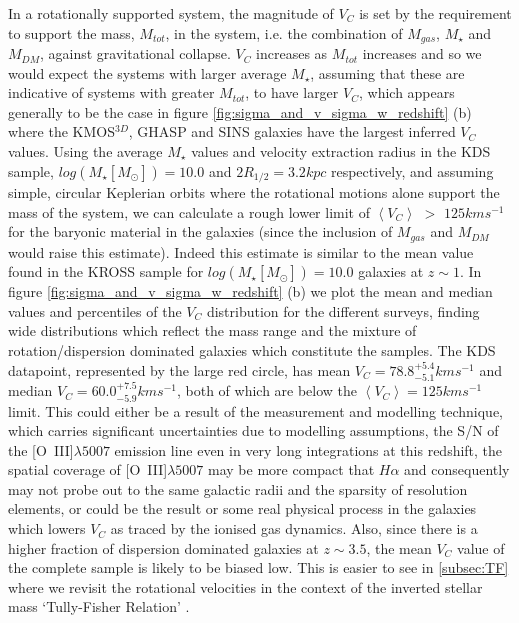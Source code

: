 \documentclass[fleqn,usenatbib]{mn2e}
\begin{document}
In a rotationally supported system, the magnitude of $V_{C}$ is set by the requirement to support the mass, $M_{tot}$, in the system, i.e. the combination of $M_{gas}$, $M_{\star}$ and $M_{DM}$, against gravitational collapse.
$V_{C}$ increases as $M_{tot}$ increases and so we would expect the systems with larger average $M_{\star}$, assuming that these are indicative of systems with greater $M_{tot}$, to have larger $V_{C}$, which appears generally to be the case in figure \ref{fig:sigma_and_v_sigma_w_redshift} (b) where the KMOS$^{3D}$, GHASP and SINS galaxies have the largest inferred $V_{C}$ values.
Using the average $M_{\star}$ values and velocity extraction radius in the KDS sample, $log(M_{\star}[M_{\odot}])=10.0$ and $2R_{1/2} = 3.2kpc$ respectively, and assuming simple, circular Keplerian orbits where the rotational motions alone support the mass of the system, we can calculate a rough lower limit of $\left<V_{C}\right>$ $>$ $125kms^{-1}$ for the baryonic material in the galaxies (since the inclusion of $M_{gas}$ and $M_{DM}$ would raise this estimate).
Indeed this estimate is similar to the mean value found in the KROSS sample for $log(M_{\star}[M_{\odot}])=10.0$ galaxies at $z\sim1$.
In figure \ref{fig:sigma_and_v_sigma_w_redshift} (b) we plot the mean and median values and percentiles of the $V_{C}$ distribution for the different surveys, finding wide distributions which reflect the mass range and the mixture of rotation/dispersion dominated galaxies which constitute the samples.
The KDS datapoint, represented by the large red circle, has mean $V_{C} = 78.8^{+5.4}_{-5.1}kms^{-1}$ and median $V_{C} = 60.0^{+7.5}_{-5.9}kms^{-1}$, both of which are below the $\left<V_{C}\right> = 125kms^{-1}$ limit.
This could either be a result of the measurement and modelling technique, which carries significant uncertainties due to modelling assumptions, the S/N of the [O~{\sc III}]$\lambda5007$ emission line even in very long integrations at this redshift, the spatial coverage of [O~{\sc III}]$\lambda5007$ may be more compact that $H\alpha$ and consequently may not probe out to the same galactic radii and the sparsity of resolution elements, or could be the result or some real physical process in the galaxies which lowers $V_{C}$ as traced by the ionised gas dynamics.
Also, since there is a higher fraction of dispersion dominated galaxies at $z\sim3.5$, the mean $V_{C}$ value of the complete sample is likely to be biased low.
This is easier to see in \cref{subsec:TF} where we revisit the rotational velocities in the context of the inverted stellar mass `Tully-Fisher Relation' \citep[smTFR;][]{Tully1977,Bell2000a}.
\end{document}
